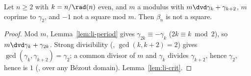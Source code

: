 \begin{proposition}
  \label{lem:li-even}
  \leanok
  Let $n \ge 2$ with $k = n/\rad(n)$ even, and $m$ a modulus with $m \dvd \gamma_k + \gamma_{k+2}$,
  $m$ coprime to $\gamma_2$, and $-1$ not a square mod $m$. Then $\beta_n$ is not a square.
\end{proposition}
\begin{proof}
  \leanok
  Mod $m$, Lemma~\ref{lem:li-period} gives $\gamma_{2k} \equiv -\gamma_k$ ($2k \equiv k \bmod 2$),
  so $m \dvd \gamma_k + \gamma_{2k}$. Strong divisibility (,
  $\gcd(k, k+2) = 2$) gives $\gcd(\gamma_k, \gamma_{k+2}) = \gamma_2$; a common divisor of $m$
  and $\gamma_k$ divides $\gamma_{k+2}$, hence $\gamma_2$, hence is $1$
  (, over any Bézout domain).
  Lemma~\ref{lem:li-crit}.
\end{proof}

